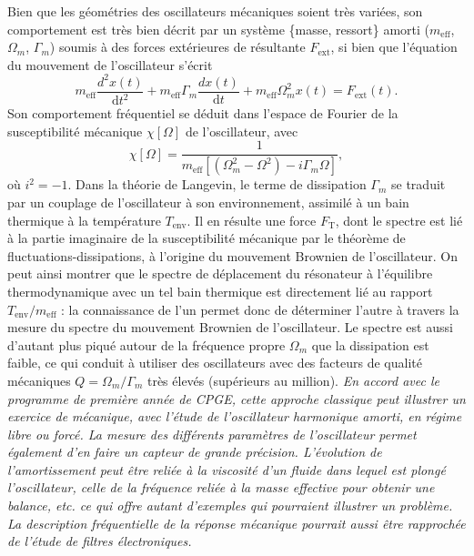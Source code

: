\documentclass[12pt,a4paper]{article}
\renewcommand{\d}{\mathrm{d}}
\begin{document}
Bien que les géométries des oscillateurs mécaniques soient très variées, son comportement est très bien décrit par un système \{masse, ressort\} amorti ($m_\mathrm{eff}$, $\Omega_m$, $\Gamma_m$) soumis à des forces extérieures de résultante $F_\mathrm{ext}$, si bien que l'équation du mouvement de l'oscillateur s'écrit
\begin{equation}
m_\mathrm{eff} \frac{d^2 x(t)}{\d t^2} + m_\mathrm{eff}\Gamma_m \frac{d x(t)}{\d t} + m_\mathrm{eff} \Omega_m^2 x(t) = F_\mathrm{ext}(t).
\end{equation}
Son comportement fréquentiel se déduit dans l'espace de Fourier de la susceptibilité mécanique $\chi[\Omega]$ de l'oscillateur, avec
\begin{equation}
\chi[\Omega] = \frac{1}{m_\mathrm{eff}[(\Omega_m^2-\Omega^2)-i\Gamma_m\Omega]},
\end{equation}
où $i^2=-1$. 
Dans la théorie de Langevin, le terme de dissipation $\Gamma_m$ se traduit par un couplage de l'oscillateur à son environnement, assimilé à un bain thermique à la température $T_\mathrm{env}$.
Il en résulte une force $F_\mathrm{T}$, dont le spectre est lié à la partie imaginaire de la susceptibilité mécanique par le théorème de fluctuations-dissipations, à l'origine du mouvement Brownien de l'oscillateur.
On peut ainsi montrer que le spectre de déplacement du résonateur à l'équilibre thermodynamique avec un tel bain thermique est directement lié au rapport $T_\mathrm{env}/m_\mathrm{eff}$ : la connaissance de l'un permet donc de déterminer l'autre à travers la mesure du spectre du mouvement Brownien de l'oscillateur.
Le spectre est aussi d'autant plus piqué autour de la fréquence propre $\Omega_m$ que la dissipation est faible, ce qui conduit à utiliser des oscillateurs avec des facteurs de qualité mécaniques $Q=\Omega_m/\Gamma_m$ très élevés (supérieurs au million).
\emph{En accord avec le programme de première année de CPGE, cette approche classique peut illustrer un exercice de mécanique, avec l'étude de l'oscillateur harmonique amorti, en régime libre ou forcé.
La mesure des différents paramètres de l'oscillateur permet également d'en faire un capteur de grande précision.
L'évolution de l'amortissement peut être reliée à la viscosité d'un fluide dans lequel est plongé l'oscillateur, celle de la fréquence reliée à la masse effective pour obtenir une balance, etc. ce qui offre autant d'exemples qui pourraient illustrer un problème.
La description fréquentielle de la réponse mécanique pourrait aussi être rapprochée de l'étude de filtres électroniques.}
\end{document}
